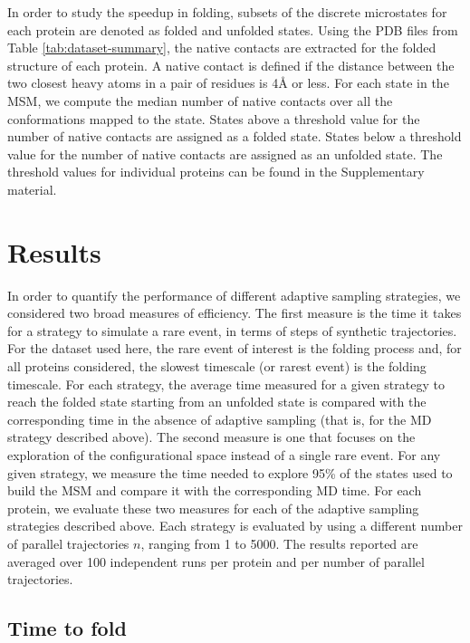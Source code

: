 In order to study the speedup in folding, subsets of the discrete microstates for
each protein are denoted as folded and unfolded states. 
Using the PDB files from Table \ref{tab:dataset-summary}, the native contacts
are extracted for the folded structure of each protein. A native contact is
defined if the distance between the two closest heavy atoms in a pair of
residues is 4\r{A} or less. For each state in the MSM, we compute the median number of native
contacts over all the conformations mapped to the state. States above a threshold
value for the number of native contacts are assigned as a folded state. States
below a threshold value for the number of native contacts are assigned as an
unfolded state. The threshold values for individual proteins can be found in the Supplementary material. 




\section{\label{sec:results}Results}

In order to quantify the performance of different adaptive sampling strategies,
we considered two broad measures of efficiency. The first measure is the time
it takes for a strategy to simulate a rare event, in terms of steps of synthetic
trajectories. For the dataset used here, the rare event of interest is the
folding process and, for all proteins considered, the slowest timescale (or
rarest event) is the folding timescale. For each strategy, the average time measured
for a given strategy to reach the folded state starting from an unfolded state
is compared with the corresponding time in the absence of adaptive sampling
(that is, for the MD strategy described above). The second measure is one
that focuses on the exploration of the configurational space instead of a single
rare event. For any given strategy, we measure the time needed to explore 95\%
of the states used to build the MSM and compare it with the corresponding MD time.
For each protein, we evaluate these two measures for each of the adaptive
sampling strategies described above. Each strategy is evaluated by using a different
number of parallel trajectories $n$, ranging from 1 to 5000. 
The results reported
are averaged over 100 independent runs per protein and per number of parallel
trajectories.

\subsection{\label{sec:time-fold}Time to fold}

